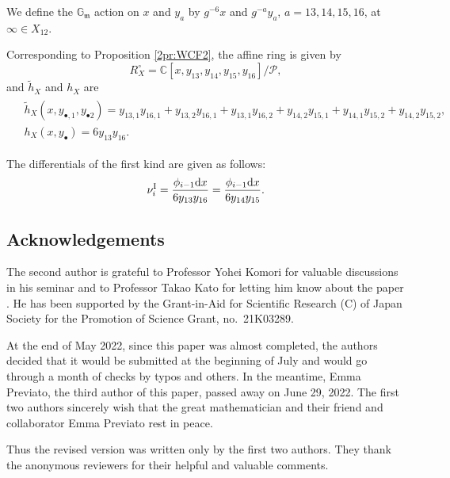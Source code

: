 \documentclass[pdftex]{sigma}
\def\CC{{\mathbb C}}
\def\GG{{\mathbb G}}
\def\cP{{\mathcal P}}
\def\fm{{\mathfrak m}}
\def\th{{\widetilde h}}
\def\nuI#1{{\nu^{\mathrm{I}}_{#1}}}
\numberwithin{equation}{section}
\begin{document}
We define the $\GG_\fm$ action on $x$ and $y_a$ by $g^{-6} x$ and $g^{-a} y_a$, $a = 13, 14, 15, 16$, at $\infty \in X_{12}$.

Corresponding to Proposition \ref{2pr:WCF2}, the affine ring is given by
\[
R_{X}^\circ =\CC[x, y_{13}, y_{14}, y_{15}, y_{16}]/ \cP,
\]
and $\th_X$ and $h_X$ are
\begin{gather*}
\begin{split}
&\th_X(x, y_{\bullet,1}, y_{\bullet 2}) =
 y_{13,1} y_{16,1}
+ y_{13,2} y_{16,1}
+ y_{13,1} y_{16,2}
+ y_{14,2} y_{15,1}
+ y_{14,1} y_{15,2}
+ y_{14,2} y_{15,2},\\
&h_X(x, y_\bullet) = 6 y_{13} y_{16}.
\end{split}
\end{gather*}

The differentials of the first kind are given as follows:
\[
\nuI{i}=\frac{\phi_{i-1} {\rm d} x}{6 y_{13}y_{16}}=\frac{\phi_{i-1} {\rm d} x}{6 y_{14}y_{15}}.
\]

\subsection*{Acknowledgements}

The second author is grateful to Professor Yohei Komori for valuable discussions in his seminar and to Professor Takao Kato for letting him know about the paper \cite{CoppensKato}.
He has been supported by the Grant-in-Aid for Scientific Research (C) of Japan Society for the Promotion of Science Grant, no.~21K03289.

At the end of May 2022, since this paper was almost completed, the authors decided that it would be submitted at the beginning of July and would go through a month of checks by typos and others.
In the meantime, Emma Previato, the third author of this paper, passed away on June 29, 2022.
The first two authors sincerely wish that the great mathematician and their friend and collaborator Emma Previato rest in peace.

Thus the revised version was written only by the first two authors.
They thank the anonymous reviewers for their helpful and valuable comments.
\end{document}
